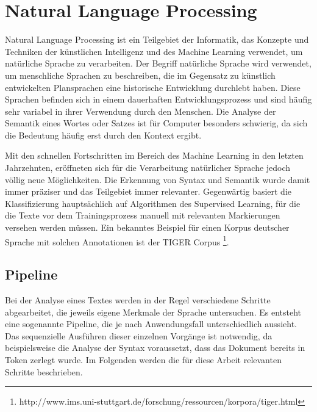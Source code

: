 \section{Natural Language Processing}
Natural Language Processing ist ein Teilgebiet der Informatik, das Konzepte und Techniken der künstlichen Intelligenz und des Machine Learning verwendet, um natürliche Sprache zu verarbeiten. Der Begriff natürliche Sprache wird verwendet, um menschliche Sprachen zu beschreiben, die im Gegensatz zu künstlich entwickelten Plansprachen eine historische Entwicklung durchlebt haben. Diese Sprachen befinden sich in einem dauerhaften Entwicklungsprozess und sind häufig sehr variabel in ihrer Verwendung durch den Menschen. Die Analyse der Semantik eines Wortes oder Satzes ist für Computer besonders schwierig, da sich die Bedeutung häufig erst durch den Kontext ergibt.

Mit den schnellen Fortschritten im Bereich des Machine Learning in den letzten Jahrzehnten, eröffneten sich für die Verarbeitung natürlicher Sprache jedoch völlig neue Möglichkeiten. Die Erkennung von Syntax und Semantik wurde damit immer präziser und das Teilgebiet immer relevanter. Gegenwärtig basiert die Klassifizierung hauptsächlich auf Algorithmen des Supervised Learning, für die die Texte vor dem Trainingsprozess manuell mit relevanten Markierungen versehen werden müssen. Ein bekanntes Beispiel für einen Korpus deutscher Sprache mit solchen Annotationen ist der TIGER Corpus \footnote{http://www.ims.uni-stuttgart.de/forschung/ressourcen/korpora/tiger.html}.

\subsection{Pipeline}\label{pipeline}
Bei der Analyse eines Textes werden in der Regel verschiedene Schritte abgearbeitet, die jeweils eigene Merkmale der Sprache untersuchen. Es entsteht eine sogenannte Pipeline, die je nach Anwendungsfall unterschiedlich aussieht. Das sequenzielle Ausführen dieser einzelnen Vorgänge ist notwendig, da beispielsweise die Analyse der Syntax voraussetzt, dass das Dokument bereits in Token zerlegt wurde. Im Folgenden werden die für diese Arbeit relevanten Schritte beschrieben.

